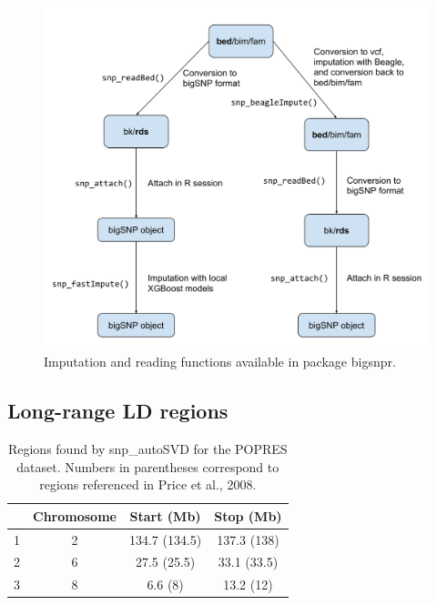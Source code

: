 \documentclass[a4paper, 11pt]{article}
\begin{document}
\begin{figure}[!h]
\centerline{\includegraphics[width=\linewidth]{imputation.pdf}}
\caption{Imputation and reading functions available in package bigsnpr.}\label{fig:impute}
\end{figure}

\clearpage

\subsection{Long-range LD regions}

\begin{table}[!h]
\centering
\begin{tabular}{lccc}
  \hline
 & Chromosome & Start (Mb) & Stop (Mb) \\ 
  \hline
1 &  2 & 134.7 (134.5) & 137.3 (138) \\ 
  2 &  6 & 27.5 (25.5) & 33.1 (33.5) \\ 
  3 &  8 & 6.6 (8) & 13.2 (12) \\ 
   \hline
\end{tabular}
\caption{\label{tab:lrldr-popres}Regions found by snp\_autoSVD for the POPRES dataset. Numbers in parentheses correspond to regions referenced in Price et al., 2008.}
\end{table}

\vspace{5em}
\end{document}
